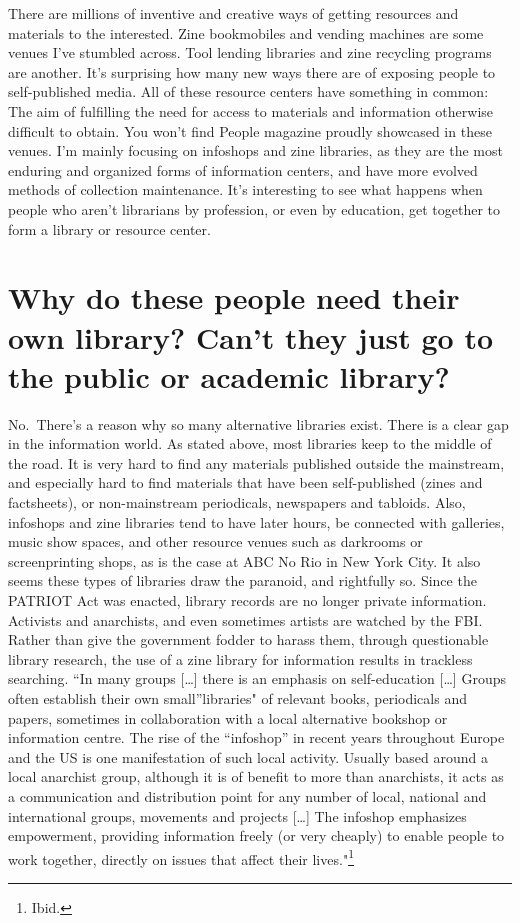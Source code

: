 \documentclass[output=paper]{langscibook}
\begin{document}
There are millions of inventive and creative ways of getting resources
and materials to the interested. Zine bookmobiles and vending machines
are some venues I've stumbled across. Tool lending libraries and zine
recycling programs are another. It's surprising how many new ways there
are of exposing people to self-published media. All of these resource
centers have something in common: The aim of fulfilling the need for
access to materials and information otherwise difficult to obtain. You
won't find People magazine proudly showcased in these venues. I'm mainly
focusing on infoshops and zine libraries, as they are the most enduring
and organized forms of information centers, and have more evolved
methods of collection maintenance. It's interesting to see what happens
when people who aren't librarians by profession, or even by education,
get together to form a library or resource center.

\hypertarget{why-do-these-people-need-their-own-library-cant-they-just-go-to-the-public-or-academic-library}{%
\section*{Why do these people need their own library? Can't they just go
to the public or academic
library?}\label{why-do-these-people-need-their-own-library-cant-they-just-go-to-the-public-or-academic-library}}

No.~There's a reason why so many alternative libraries exist. There is a
clear gap in the information world. As stated above, most libraries keep
to the middle of the road. It is very hard to find any materials
published outside the mainstream, and especially hard to find materials
that have been self-published (zines and factsheets), or non-mainstream
periodicals, newspapers and tabloids. Also, infoshops and zine libraries
tend to have later hours, be connected with galleries, music show
spaces, and other resource venues such as darkrooms or screenprinting
shops, as is the case at ABC No Rio in New York City. It also seems
these types of libraries draw the paranoid, and rightfully so. Since the
PATRIOT Act was enacted, library records are no longer private
information. Activists and anarchists, and even sometimes artists are
watched by the FBI. Rather than give the government fodder to harass
them, through questionable library research, the use of a zine library
for information results in trackless searching. \enquote{In many groups
{[}\ldots{]} there is an emphasis on self-education {[}\ldots{]} Groups
often establish their own small}libraries" of relevant books,
periodicals and papers, sometimes in collaboration with a local
alternative bookshop or information centre. The rise of the
\enquote{infoshop} in recent years throughout Europe and the US is one
manifestation of such local activity. Usually based around a local
anarchist group, although it is of benefit to more than anarchists, it
acts as a communication and distribution point for any number of local,
national and international groups, movements and projects {[}\ldots{]}
The infoshop emphasizes empowerment, providing information freely (or
very cheaply) to enable people to work together, directly on issues that
affect their lives."\footnote{Ibid.}
\end{document}
